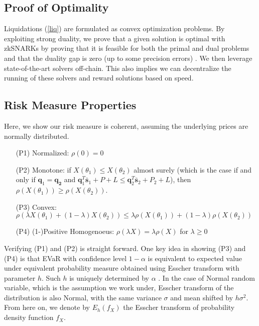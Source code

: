 \documentclass{article}
\begin{document}
\subsection{Proof of Optimality}

Liquidations (\ref{liq}) are formulated as convex optimization problems. By exploiting strong duality, we prove that a given solution is optimal with zkSNARKs by proving that it is feasible for both the primal and dual problems and that the duality gap is zero (up to some precision errors) \cite{angel2022efficient}. We then leverage state-of-the-art solvers off-chain. This also implies we can decentralize the running of these solvers and reward solutions based on speed.




\begin{appendices}
\section{Risk Measure Properties} \label{app1}
Here, we show our risk measure is coherent, assuming the underlying prices are normally distributed. 

\begin{itemize}
    \item[(P1)] Normalized: $\rho(0)=0$
    \item[(P2)] Monotone: if $X(\theta_1) \leq X(\theta_2)$ almost surely (which is the case if and only if $\mathbf{q}_1 = \mathbf{q_2}$ and $\mathbf{q}_1^T\mathbf{\overline{s}}_1+P+L\leq \mathbf{q}_2^T\mathbf{\overline{s}}_2+P_2+L$), then $\rho(X(\theta_1)) \geq \rho(X(\theta_2))$. 
    \item[(P3)] Convex: $\rho(\lambda X(\theta_1) + (1-\lambda) X(\theta_2)) \leq \lambda\rho(X(\theta_1))+(1-\lambda)\rho(X(\theta_2))$
    \item[(P4)] (1-)Positive Homogenoeus: $\rho(\lambda X) = \lambda \rho(X)$ for $\lambda \geq 0$
\end{itemize}

Verifying (P1) and (P2) is straight forward. One key idea in showing (P3) and (P4) is that EVaR with confidence level $1-\alpha$ is equivalent to expected value under equivalent probability measure obtained using Esscher transform with parameter $h$. Such $h$ is uniquely determined by $\alpha$ \cite{chengli2012coherent}. In the case of Normal random variable, which is the assumption we work under, Esscher transform of the distribution is also Normal, with the same variance $\sigma$ and mean shifted by $h\sigma^2$. From here on, we denote by $E_h(f_X)$ the Esscher transform of probability density function $f_X$.


\end{appendices}
\end{document}
